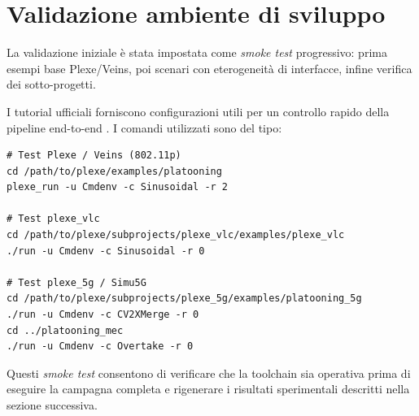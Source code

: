 \section{Validazione ambiente di sviluppo}

La validazione iniziale è stata impostata come \emph{smoke test} progressivo: prima esempi base Plexe/Veins, poi scenari con eterogeneità di interfacce, infine verifica dei sotto-progetti.

I tutorial ufficiali forniscono configurazioni utili per un controllo rapido della pipeline end-to-end \cite{plexe_tutorial,plexe_example6}. I comandi utilizzati sono del tipo:

\begin{lstlisting}[caption={Esecuzione di scenari tutorial da CLI (Cmdenv)},label={lst:smoke_commands}]
# Test Plexe / Veins (802.11p)
cd /path/to/plexe/examples/platooning
plexe_run -u Cmdenv -c Sinusoidal -r 2

# Test plexe_vlc
cd /path/to/plexe/subprojects/plexe_vlc/examples/plexe_vlc
./run -u Cmdenv -c Sinusoidal -r 0

# Test plexe_5g / Simu5G
cd /path/to/plexe/subprojects/plexe_5g/examples/platooning_5g
./run -u Cmdenv -c CV2XMerge -r 0
cd ../platooning_mec
./run -u Cmdenv -c Overtake -r 0

\end{lstlisting}

Questi \emph{smoke test} consentono di verificare che la toolchain sia operativa prima di eseguire la campagna completa e rigenerare i risultati sperimentali descritti nella sezione successiva.
